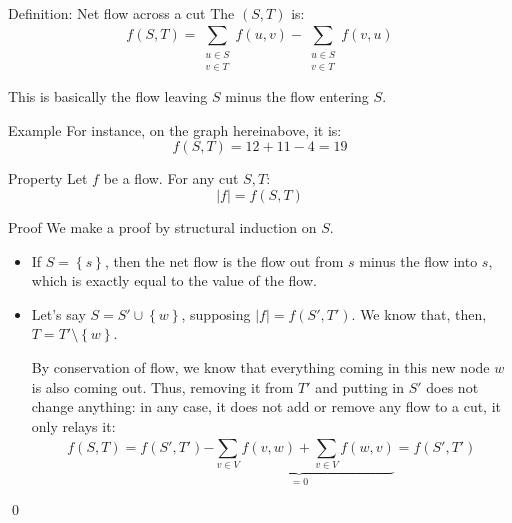 \documentclass[a4paper]{article}
\begin{document}
\begin{parag}{Definition: Net flow across a cut}
    The  $\left(S, T\right)$ is: 
    \[f\left(S, T\right) = \sum_{\substack{u \in S \\ v \in T}}^{} f\left(u, v\right) - \sum_{\substack{u \in S \\ v \in T}}^{} f\left(v, u\right)\]
    
    This is basically the flow leaving $S$ minus the flow entering $S$.

    \begin{subparag}{Example}
        For instance, on the graph hereinabove, it is: 
        \[f\left(S, T\right) = 12 + 11 - 4 = 19\]
    \end{subparag}
\end{parag}

\begin{parag}{Property}
    Let $f$ be a flow. For any cut $S, T$: 
    \[\left|f\right| = f\left(S, T\right)\]
    
    \begin{subparag}{Proof}
        We make a proof by structural induction on $S$.

        \begin{itemize}[left=0pt]
            \item If $S = \left\{s\right\}$, then the net flow is the flow out from $s$ minus the flow into $s$, which is exactly equal to the value of the flow.
            \item Let's say $S = S' \cup \left\{w\right\}$, supposing $\left|f\right| = f\left(S', T'\right)$. We know that, then, $T = T' \setminus \left\{w\right\}$.

            By conservation of flow, we know that everything coming in this new node $w$ is also coming out. Thus, removing it from $T'$ and putting in $S'$ does not change anything: in any case, it does not add or remove any flow to a cut, it only relays it: 
            \[f\left(S, T\right) = f\left(S', T'\right) \underbrace{- \sum_{v \in V}^{} f\left(v, w\right) + \sum_{v \in V}^{} f\left(w, v\right)}_{= 0} = f\left(S', T'\right)\]
        \end{itemize}

        \qed
    \end{subparag}
\end{parag}
\end{document}

